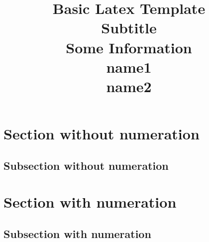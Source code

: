 \documentclass[10pt,a4paper]{article}
\title{%
	\textbf{Basic Latex Template} \\[12pt]
	\normalsize Subtitle \\
	\small Some Information\\
	\large name1 \\
	\large name2
	}
\date{}
\begin{document}
	\maketitle
	
	\section*{Section without numeration}
		\subsection*{Subsection without numeration}
		
	\section{Section with numeration}
		\subsection{Subsection with numeration}
		
\end{document}
